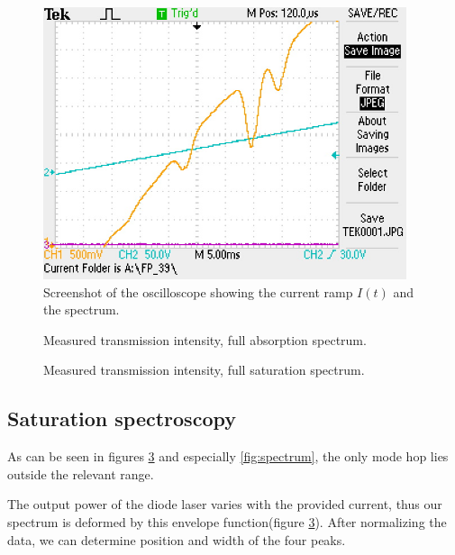 \begin{figure}[h]
	\centering
	\includegraphics[width=0.95\textwidth]{data/TEK0001.jpg}
	\caption{Screenshot of the oscilloscope showing the current ramp $I(t)$ and the spectrum.}
	\label{fig:oszi}
	\vspace{-2em}
\end{figure}

\begin{figure}[p]
	\centering
	
	\vspace{-2em}
	\caption{Measured transmission intensity, full absorption spectrum.}
	\label{fig:absorption}
	\vspace{-1em}
\end{figure}

\begin{figure}[p]
	\centering
	
	\vspace{-2em}
	\caption{Measured transmission intensity, full saturation spectrum.}
	\label{fig:saturation}
\end{figure}

\newpage
\subsection{Saturation spectroscopy}
As can be seen in figures \ref{fig:saturation} and especially \ref{fig:spectrum}, the only mode hop lies outside the relevant range.

The output power of the diode laser varies with the provided current, thus our spectrum is deformed by this envelope function(figure \ref{fig:saturation}). After normalizing the data, we can determine position and width of the four peaks.

